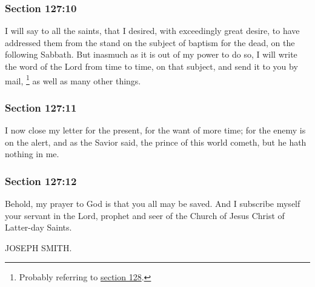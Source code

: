 	\subsubsection{Section 127:10} %
		\label{DC127-10}

		I will say to all the saints, that I desired, with exceedingly great desire, to have addressed them from the stand on the subject of baptism for the dead, on the following Sabbath.  But inasmuch as it is out of my power to do so, I will write the word of the Lord from time to time, on that subject, and send it to you by mail,%
			\footnote{%
				Probably referring to \hyperref[DC128]{section 128}.
				}
		as well as many other things.


	\subsubsection{Section 127:11} %
		\label{DC127-11}

		I now close my letter for the present, for the want of more time; for the enemy is on the alert, and as the Savior said, the prince of this world cometh, but he hath nothing in me.


	\subsubsection{Section 127:12} %
		\label{DC127-12}

		Behold, my prayer to God is that you all may be saved.  And I subscribe myself your servant in the Lord, prophet and seer of the Church of Jesus Christ of Latter-day Saints.

		JOSEPH SMITH.

